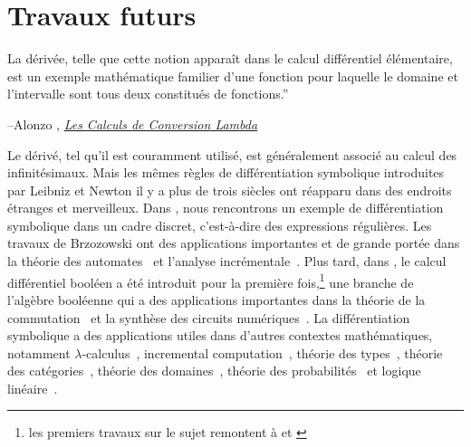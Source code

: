 \section{Travaux futurs}\label{sec:future-work}


\vspace{2pt}\setlength{\epigraphwidth}{0.60\textwidth}
\epigraph{La dérivée, telle que cette notion apparaît dans le calcul différentiel élémentaire, est un exemple mathématique familier d'une fonction pour laquelle le domaine et l'intervalle sont tous deux constitués de fonctions.''}{\begin{flushright}--Alonzo \citet{church1941calculi}, \href{https://archive.org/details/AnnalsOfMathematicalStudies6ChurchAlonzoTheCalculiOfLambdaConversionPrincetonUniversityPress1941}{\textit{Les Calculs de Conversion Lambda}}\end{flushright}}

Le dérivé, tel qu'il est couramment utilisé, est généralement associé au calcul des infinitésimaux. Mais les mêmes règles de différentiation symbolique introduites par Leibniz et Newton il y a plus de trois siècles ont réapparu dans des endroits étranges et merveilleux. Dans \citet{brzozowski1964derivatives}, nous rencontrons un exemple de différentiation symbolique dans un cadre discret, c'est-à-dire des expressions régulières. Les travaux de Brzozowski ont des applications importantes et de grande portée dans la théorie des automates~\citep{berry1986regex, antimirov1996partial, champarnaud1999regular} et l'analyse incrémentale~\citep{might2011parsing, moss2014derivatives}. Plus tard, dans \citet{thayse1981boolean}, le calcul différentiel booléen a été introduit pour la première fois,\hspace{-. 08em}\footnote{\aussi les premiers travaux sur le sujet remontent à \citet{talantsev1959analysis} et \citet{sellers1968analyzing}} une branche de l'algèbre booléenne qui a des applications importantes dans la théorie de la commutation~\citep{thayse1973boolean} et la synthèse des circuits numériques~\citep{steinbach2017boolean}. La différentiation symbolique a des applications utiles dans d'autres contextes mathématiques, notamment $\lambda$-calculus~\citep{ehrhard2003differential, cai2014theory, kelly2016evolving, brunel2020backpropagation}, incremental computation~\citep{alvarez2019fixing, alvarez2019change}, théorie des types~\citep{mcbride2001derivative, mcbride2008clowns, chen2012type}, théorie des catégories~\citep{blute2006differential, blute2009cartesian}, théorie des domaines~\citep{edalat2002domain}, théorie des probabilités~\citep{kac1951probability} et logique linéaire~\citep{ehrhard2018introduction, clift2018derivatives}.

